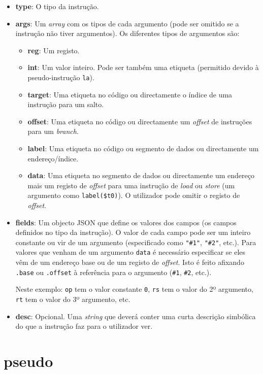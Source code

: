\documentclass[11pt,a4paper,twoside,titlepage]{report}
\begin{document}
\begin{itemize}
	\item \textbf{type}: O tipo da instrução.
	\item \textbf{args}: Um \emph{array} com os tipos de cada argumento (pode ser
		omitido se a instrução não tiver argumentos).
		Os diferentes tipos de argumentos são:
		\begin{itemize}
			\item \textbf{reg}: Um registo.
			\item \textbf{int}: Um valor inteiro. Pode ser também uma etiqueta
				(permitido devido à pseudo-instrução \verb+la+).
			\item \textbf{target}: Uma etiqueta no código ou directamente o índice de
				uma instrução para um salto.
			\item \textbf{offset}: Uma etiqueta no código ou directamente um
				\emph{offset} de instruções para um \emph{branch}.
			\item \textbf{label}: Uma etiqueta no código ou segmento de dados ou
				directamente um endereço/índice.
			\item \textbf{data}: Uma etiqueta no segmento de dados ou directamente um
				endereço mais um registo de \emph{offset} para uma instrução de
				\emph{load} ou \emph{store} (um argumento como \verb+label($t0)+). O
				utilizador pode omitir o registo de \emph{offset}.
		\end{itemize}
	\item \textbf{fields}: Um objecto JSON que define os valores dos campos (os
		campos definidos no tipo da instrução). O valor de cada campo pode ser
		um inteiro constante ou vir de um argumento (especificado como \verb+"#1"+,
		\verb+"#2"+, etc.).
		Para valores que venham de um argumento \verb+data+ é necessário especificar
		se eles vêm de um endereço base ou de um registo de \emph{offset}.
		Isto é feito afixando \verb+.base+ ou \verb+.offset+ à referência para o
		argumento (\verb+#1+, \verb+#2+, etc.).
		
		Neste exemplo: \verb+op+ tem o valor constante \verb+0+, \verb+rs+ tem
		o valor do 2º argumento, \verb+rt+ tem o valor do 3º argumento, etc.
	\item \textbf{desc}: Opcional. Uma \emph{string} que deverá conter uma
		curta descrição simbólica do que a instrução faz para o utilizador ver.
\end{itemize}


\section{pseudo}
\end{document}
